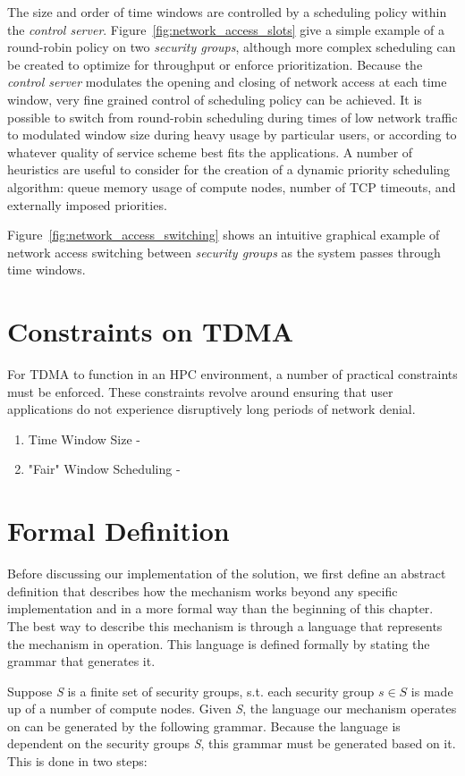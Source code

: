 \documentclass[oneside,12pt]{memoir}
\begin{document}
The size and order of time windows are controlled by a scheduling policy within the \textit{control server}. Figure~\ref{fig:network_access_slots} give a simple example of a round-robin policy on two \textit{security groups}, although more complex scheduling can be created to optimize for throughput or enforce prioritization. Because the \textit{control server} modulates the opening and closing of network access at each time window, very fine grained control of scheduling policy can be achieved. It is possible to switch from round-robin scheduling during times of low network traffic to modulated window size during heavy usage by particular users, or according to whatever quality of service scheme best fits the applications. A number of heuristics are useful to consider for the creation of a dynamic priority scheduling algorithm: queue memory usage of compute nodes, number of TCP timeouts, and externally imposed priorities. 

Figure~\ref{fig:network_access_switching} shows an intuitive graphical example of network access switching between \textit{security groups} as the system passes through time windows.

\section{Constraints on TDMA}
For TDMA to function in an HPC environment, a number of practical constraints must be enforced. These constraints revolve around ensuring that user applications do not experience disruptively long periods of network denial.
\begin{enumerate} \itemsep1pt \parskip0pt 
\item Time Window Size - 
\item "Fair" Window Scheduling - 
\end{enumerate}
\section{Formal Definition}
\label{sec:formal_definition}
Before discussing our implementation of the solution, we first define an abstract definition that describes how the mechanism works beyond any specific implementation and in a more formal way than the beginning of this chapter. The best way to describe this mechanism is through a language that represents the mechanism in operation. This language is defined formally by stating the grammar that generates it.

Suppose \emph{S} is a finite set of security groups, s.t. each security group $s\in S$ is made up of a number of compute nodes. Given \emph{S}, the language our mechanism operates on can be generated by the following grammar. Because the language is dependent on the security groups \emph{S}, this grammar must be generated based on it. This is done in two steps:
\end{document}
